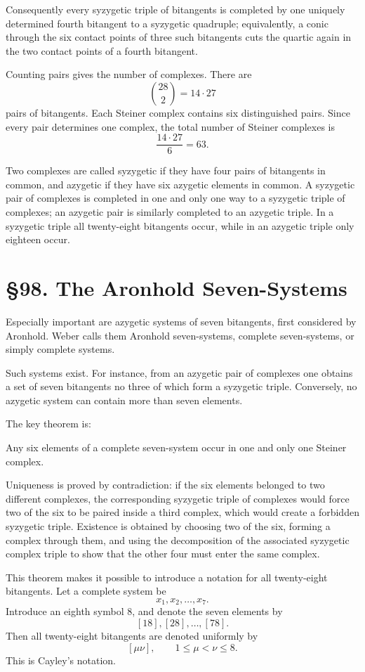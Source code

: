 \documentclass[11pt,a4paper]{book}
\newcommand{\webersection}[2]{\clearpage\section*{\S #1. #2}}
\begin{document}
Consequently every syzygetic triple of bitangents is completed by one uniquely determined fourth bitangent to a syzygetic quadruple; equivalently, a conic through the six contact points of three such bitangents cuts the quartic again in the two contact points of a fourth bitangent.

Counting pairs gives the number of complexes.  There are
\[
\binom{28}{2}=14\cdot27
\]
pairs of bitangents.  Each Steiner complex contains six distinguished pairs.  Since every pair determines one complex, the total number of Steiner complexes is
\[
\frac{14\cdot27}{6}=63.
\]

Two complexes are called syzygetic if they have four pairs of bitangents in common, and azygetic if they have six azygetic elements in common.  A syzygetic pair of complexes is completed in one and only one way to a syzygetic triple of complexes; an azygetic pair is similarly completed to an azygetic triple.  In a syzygetic triple all twenty-eight bitangents occur, while in an azygetic triple only eighteen occur.

\webersection{98}{The Aronhold Seven-Systems}

Especially important are azygetic systems of seven bitangents, first considered by Aronhold.  Weber calls them Aronhold seven-systems, complete seven-systems, or simply complete systems.

Such systems exist.  For instance, from an azygetic pair of complexes one obtains a set of seven bitangents no three of which form a syzygetic triple.  Conversely, no azygetic system can contain more than seven elements.

The key theorem is:

Any six elements of a complete seven-system occur in one and only one Steiner complex.

Uniqueness is proved by contradiction: if the six elements belonged to two different complexes, the corresponding syzygetic triple of complexes would force two of the six to be paired inside a third complex, which would create a forbidden syzygetic triple.  Existence is obtained by choosing two of the six, forming a complex through them, and using the decomposition of the associated syzygetic complex triple to show that the other four must enter the same complex.

This theorem makes it possible to introduce a notation for all twenty-eight bitangents.  Let a complete system be
\[
x_1,x_2,\ldots,x_7.
\]
Introduce an eighth symbol \(8\), and denote the seven elements by
\[
[18],[28],\ldots,[78].
\]
Then all twenty-eight bitangents are denoted uniformly by
\[
[\mu\nu],\qquad 1\le \mu<\nu\le8.
\]
This is Cayley's notation.
\end{document}
